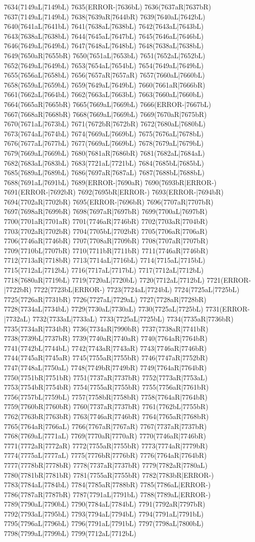 7634(7149aL|7149bL) 7635(ERROR-|7636bL) 7636(7637aR|7637bR) 7637(7149aL|7149bL) 7638(7639aR|7644bR) 7639(7640aL|7642bL) 7640(7641aL|7641bL) 7641(7638aL|7638bL) 7642(7643aL|7643bL) 7643(7638aL|7638bL) 7644(7645aL|7647bL) 7645(7646aL|7646bL) 7646(7649aL|7649bL) 7647(7648aL|7648bL) 7648(7638aL|7638bL) 7649(7650aR|7655bR) 7650(7651aL|7653bL) 7651(7652aL|7652bL) 7652(7649aL|7649bL) 7653(7654aL|7654bL) 7654(7649aL|7649bL) 7655(7656aL|7658bL) 7656(7657aR|7657aR) 7657(7660aL|7660bL) 7658(7659aL|7659bL) 7659(7649aL|7649bL) 7660(7661aR|7666bR) 7661(7662aL|7664bL) 7662(7663aL|7663bL) 7663(7660aL|7660bL) 7664(7665aR|7665bR) 7665(7669aL|7669bL) 7666(ERROR-|7667bL) 7667(7668aR|7668bR) 7668(7669aL|7669bL) 7669(7670aR|7675bR) 7670(7671aL|7673bL) 7671(7672bR|7672bR) 7672(7680aL|7680bL) 7673(7674aL|7674bL) 7674(7669aL|7669bL) 7675(7676aL|7678bL) 7676(7677aL|7677bL) 7677(7669aL|7669bL) 7678(7679aL|7679bL) 7679(7669aL|7669bL) 7680(7681aR|7686bR) 7681(7682aL|7684aL) 7682(7683aL|7683bL) 7683(7721aL|7721bL) 7684(7685bL|7685bL) 7685(7689aL|7689bL) 7686(7697aR|7687aL) 7687(7688bL|7688bL) 7688(7691aL|7691bL) 7689(ERROR-|7690aR) 7690(7693bR|ERROR-) 7691(ERROR-|7692bR) 7692(7695bR|ERROR-) 7693(ERROR-|7694bR) 7694(7702aR|7702bR) 7695(ERROR-|7696bR) 7696(7707aR|7707bR) 7697(7698aR|7699bR) 7698(7697aR|7697bR) 7699(7700aL|7697bR) 7700(7701aR|7701aR) 7701(7746aR|7746bR) 7702(7703aR|7704bR) 7703(7702aR|7702bR) 7704(7705bL|7702bR) 7705(7706aR|7706aR) 7706(7746aR|7746bR) 7707(7708aR|7709bR) 7708(7707aR|7707bR) 7709(7710bL|7707bR) 7710(7711bR|7711bR) 7711(7746aR|7746bR) 7712(7713aR|7718bR) 7713(7714aL|7716bL) 7714(7715aL|7715bL) 7715(7712aL|7712bL) 7716(7717aL|7717bL) 7717(7712aL|7712bL) 7718(7680aR|7719bL) 7719(7720aL|7720bL) 7720(7712aL|7712bL) 7721(ERROR-|7722bR) 7722(7723bL|ERROR-) 7723(7724aL|7724bL) 7724(7725aL|7725bL) 7725(7726aR|7731bR) 7726(7727aL|7729aL) 7727(7728aR|7728bR) 7728(7734aL|7734bL) 7729(7730aL|7730aL) 7730(7725aL|7725bL) 7731(ERROR-|7732aL) 7732(7733aL|7733aL) 7733(7725aL|7725bL) 7734(7735aR|7736bR) 7735(7734aR|7734bR) 7736(7734aR|7990bR) 7737(7738aR|7741bR) 7738(7739bL|7737bR) 7739(7740aR|7740aR) 7740(7764aR|7764bR) 7741(7742bL|7744bL) 7742(7743aR|7743aR) 7743(7746aR|7746bR) 7744(7745aR|7745aR) 7745(7755aR|7755bR) 7746(7747aR|7752bR) 7747(7748aL|7750aL) 7748(7749bR|7749bR) 7749(7764aR|7764bR) 7750(7751bR|7751bR) 7751(7737aR|7737bR) 7752(7773aR|7753aL) 7753(7754bR|7754bR) 7754(7755aR|7755bR) 7755(7756aR|7761bR) 7756(7757bL|7759bL) 7757(7758bR|7758bR) 7758(7764aR|7764bR) 7759(7760bR|7760bR) 7760(7737aR|7737bR) 7761(7762bL|7755bR) 7762(7763bR|7763bR) 7763(7746aR|7746bR) 7764(7765aR|7768bR) 7765(7764aR|7766aL) 7766(7767aR|7767aR) 7767(7737aR|7737bR) 7768(7769aL|7771aL) 7769(7770aR|7770aR) 7770(7746aR|7746bR) 7771(7772aR|7772aR) 7772(7755aR|7755bR) 7773(7774aR|7779bR) 7774(7775aL|7777aL) 7775(7776bR|7776bR) 7776(7764aR|7764bR) 7777(7778bR|7778bR) 7778(7737aR|7737bR) 7779(7782aR|7780aL) 7780(7781bR|7781bR) 7781(7755aR|7755bR) 7782(7783bR|ERROR-) 7783(7784aL|7784bL) 7784(7785aR|7788bR) 7785(7786aL|ERROR-) 7786(7787aR|7787bR) 7787(7791aL|7791bL) 7788(7789aL|ERROR-) 7789(7790aL|7790bL) 7790(7784aL|7784bL) 7791(7792aR|7797bR) 7792(7793aL|7795bL) 7793(7794aL|7794bL) 7794(7791aL|7791bL) 7795(7796aL|7796bL) 7796(7791aL|7791bL) 7797(7798aL|7800bL) 7798(7799aL|7799bL) 7799(7712aL|7712bL) 